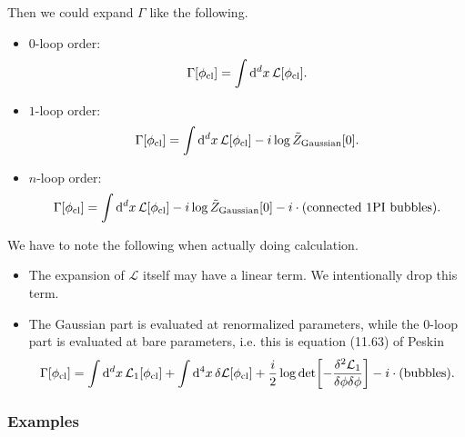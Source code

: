 \documentclass{article}
\begin{document}
Then we could expand $\Gamma$ like the following.
\begin{itemize}
    \item $0$-loop order:
    \[ \Gamma[\phi_{\textnormal{cl}}] = \int \dd[d]{x} \mathcal{L}[\phi_{\textnormal{cl}}]. \]
    \item $1$-loop order:
    \[ \Gamma[\phi_{\textnormal{cl}}] = \int \dd[d]{x} \mathcal{L}[\phi_{\textnormal{cl}}] - i \log \tilde{Z}_{\text{Gaussian}}[0]. \]
    \item $n$-loop order:
    \[ \Gamma[\phi_{\textnormal{cl}}] = \int \dd[d]{x} \mathcal{L}[\phi_{\textnormal{cl}}] - i \log \tilde{Z}_{\text{Gaussian}}[0] - i\cdot \qty(\text{connected 1PI bubbles}). \]
\end{itemize}
We have to note the following when actually doing calculation.
\begin{itemize}
    \item The expansion of $\mathcal{L}$ itself may have a linear term.
    We intentionally drop this term.
    \item The Gaussian part is evaluated at renormalized parameters, while the $0$-loop part is evaluated at bare parameters, i.e. this is equation (11.63) of Peskin
    \[ \Gamma[\phi_{\textnormal{cl}}] = \int \dd[d]{x} \mathcal{L}_1[\phi_{\textnormal{cl}}] + \int \dd[4]{x} \delta\mathcal{L}[\phi_{\textnormal{cl}}] + \frac{i}{2} \log \det[-\frac{\delta^2\mathcal{L}_1}{\delta\phi\delta\phi}] - i\cdot (\text{bubbles}). \]
\end{itemize}

\subsubsection{Examples}
\end{document}
